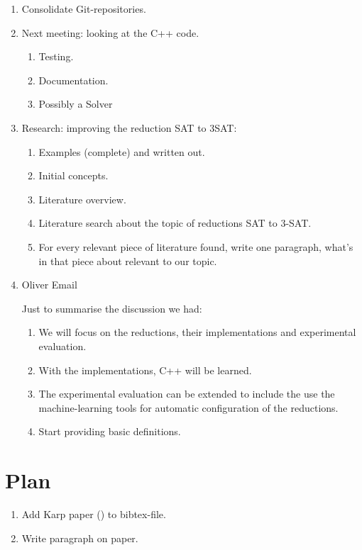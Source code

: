 \documentclass[a4paper]{report}
\begin{document}
\begin{enumerate}
\item Consolidate Git-repositories.
\item Next meeting: looking at the C++ code.
  \begin{enumerate}
  \item Testing.
  \item Documentation.
  \item Possibly a Solver
  \end{enumerate}
\item Research: improving the reduction SAT to 3SAT:
  \begin{enumerate}
  \item Examples (complete) and written out.
  \item Initial concepts.
  \item Literature overview.
  \item Literature search about the topic of reductions SAT to 3-SAT.
  \item For every relevant piece of literature found, write one paragraph, what's in that piece about relevant to our topic.
  \end{enumerate}
\item Oliver Email

  Just to summarise the discussion we had:
  \begin{enumerate}
     \item We will focus on the reductions, their implementations and experimental evaluation.
    \item With the implementations, C++ will be learned.
    \item The experimental evaluation can be extended to include the use the machine-learning tools for automatic configuration of the reductions.
    \item Start providing basic definitions.
  \end{enumerate}
\end{enumerate}



\section{Plan}
\label{sec:Plan}

\begin{enumerate}
\item Add Karp paper (\cite{Karp1972NP}) to bibtex-file.
\item Write paragraph on paper.
\end{enumerate}
\end{document}
